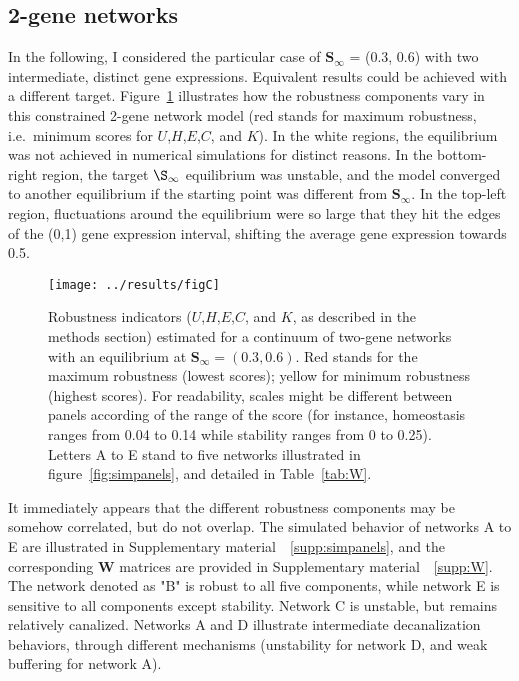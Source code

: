 \documentclass{article}
\newcommand{\SupMat}{Supplementary material~}
\begin{document}
\subsection{2-gene networks}

In the following, I considered the particular case of $\bm S_\infty$ = (0.3, 0.6) with two intermediate, distinct gene expressions. Equivalent results could be achieved with a different target. Figure~\ref{fig:imgpanels} illustrates how the robustness components vary in this constrained 2-gene network model (red stands for maximum robustness, i.e.\ minimum scores for $U$,$H$,$E$,$C$, and $K$). In the white regions, the equilibrium was not achieved in numerical simulations for distinct reasons. In the bottom-right region, the target $\S_\infty$ equilibrium was unstable, and the model converged to another equilibrium if the starting point was different from $\bm S_\infty$. In the top-left region, fluctuations around the equilibrium were so large that they hit the edges of the (0,1) gene expression interval, shifting the average gene expression towards 0.5. 

\begin{figure}[h!]
\texttt{[image: ../results/figC]}
\caption{\label{fig:imgpanels} Robustness indicators ($U$,$H$,$E$,$C$, and $K$, as described in the methods section) estimated for a continuum of two-gene networks with an equilibrium at $\bm S_\infty = (0.3, 0.6)$. Red stands for the maximum robustness (lowest scores); yellow for minimum robustness (highest scores). For readability, scales might be different between panels according of the range of the score (for instance, homeostasis ranges from 0.04 to 0.14 while stability ranges from 0 to 0.25). Letters A to E stand to five networks illustrated in figure~\ref{fig:simpanels}, and detailed in Table~\ref{tab:W}.}
\end{figure}

It immediately appears that the different robustness components may be somehow correlated, but do not overlap. The simulated behavior of networks A to E are illustrated in \SupMat~\ref{supp:simpanels}, and the corresponding $\bm W$ matrices are provided in \SupMat~\ref{supp:W}. The network denoted as "B" is robust to all five components, while network E is sensitive to all components except stability. Network C is unstable, but remains relatively canalized. Networks A and D illustrate intermediate decanalization behaviors, through different mechanisms (unstability for network D, and weak buffering for network A). 
\end{document}
